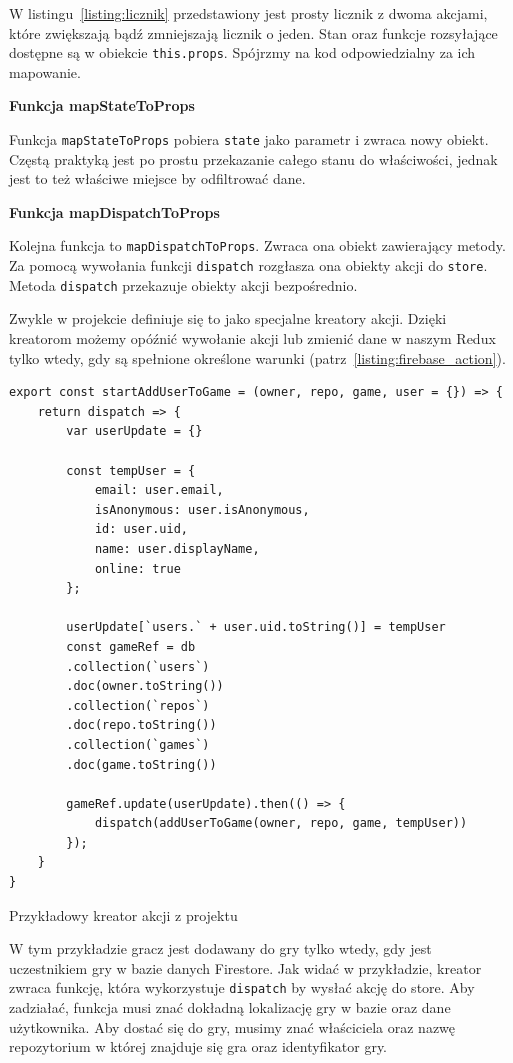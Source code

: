 W listingu~\ref{listing:licznik} przedstawiony jest prosty licznik z dwoma akcjami,
które zwiększają bądź zmniejszają licznik o jeden.
Stan oraz funkcje rozsyłające dostępne są w obiekcie \texttt{this.props}.
Spójrzmy na kod odpowiedzialny za ich mapowanie.
\begin{center}
	\textbf{Funkcja mapStateToProps}
\end{center}
Funkcja \texttt{mapStateToProps} pobiera \texttt{state} jako parametr i zwraca nowy obiekt.
Częstą praktyką jest po prostu przekazanie całego stanu do właściwości,
jednak jest to też właściwe miejsce by odfiltrować dane.
\begin{center}
	\textbf{Funkcja mapDispatchToProps}
\end{center}
Kolejna funkcja to \texttt{mapDispatchToProps}. Zwraca ona obiekt zawierający metody.
Za pomocą wywołania funkcji \texttt{dispatch} rozgłasza ona obiekty akcji do \texttt{store}.
Metoda \texttt{dispatch} przekazuje obiekty akcji bezpośrednio.

Zwykle w projekcie definiuje się to jako specjalne kreatory akcji.
Dzięki kreatorom możemy opóźnić wywołanie akcji lub zmienić dane w naszym Redux tylko wtedy,
gdy są spełnione określone warunki (patrz~\ref{listing:firebase_action}).

\begin{listing}
\begin{verbatim}
export const startAddUserToGame = (owner, repo, game, user = {}) => {
    return dispatch => {
        var userUpdate = {}

        const tempUser = {
            email: user.email,
            isAnonymous: user.isAnonymous,
            id: user.uid,
            name: user.displayName,
            online: true
        };

        userUpdate[`users.` + user.uid.toString()] = tempUser
        const gameRef = db
        .collection(`users`)
        .doc(owner.toString())
        .collection(`repos`)
        .doc(repo.toString())
        .collection(`games`)
        .doc(game.toString())

        gameRef.update(userUpdate).then(() => {
            dispatch(addUserToGame(owner, repo, game, tempUser))
        });
    }
}
\end{verbatim}
\caption{Przykładowy kreator akcji z projektu} \label{listing:firebase_action}
\end{listing}

W tym przykładzie gracz jest dodawany do gry tylko wtedy,
gdy jest uczestnikiem gry w bazie danych Firestore.
Jak widać w przykładzie, kreator zwraca funkcję,
która wykorzystuje \texttt{dispatch} by wysłać akcję do store.
Aby zadziałać, funkcja musi znać dokładną lokalizację gry w bazie oraz dane użytkownika.
Aby dostać się do gry, musimy znać właściciela oraz nazwę repozytorium w której znajduje się gra
oraz identyfikator gry.

